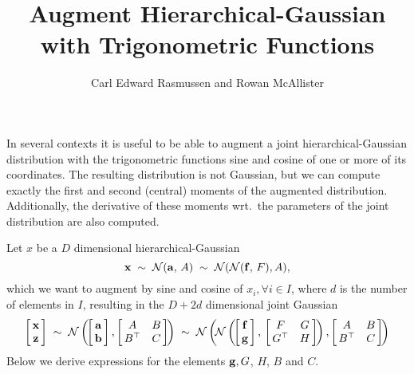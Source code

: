 \documentclass{article}
\title{Augment Hierarchical-Gaussian with Trigonometric Functions}
\author{Carl Edward Rasmussen and Rowan McAllister}
\newcommand{\bfa}{{\bf a}}
\newcommand{\bfb}{{\bf b}}
\newcommand{\bff}{{\bf f}}
\newcommand{\bfg}{{\bf g}}
\newcommand{\bfz}{{\bf z}}
\newcommand{\bfx}{{\bf x}}
\begin{document}
\maketitle

In several contexts it is useful to be able to augment a joint
hierarchical-Gaussian distribution with the trigonometric functions sine and cosine
of one or more of its coordinates. The resulting distribution is not
Gaussian, but we can compute exactly the first and second (central)
moments of the augmented distribution. Additionally, the derivative of
these moments wrt.~the parameters of the joint distribution are also
computed.

Let $x$ be a $D$ dimensional hierarchical-Gaussian
\[
\bfx\;\sim\;{\cal N}(\bfa,\,A)\;\sim\;{\cal N}({\cal N}(\bff,\,F),A),
\]
which we want to augment by sine and cosine of $x_i, \forall i\in I$,
where $d$ is the number of elements in $I$, resulting in the
$D\!+\!2d$ dimensional joint Gaussian
\[
\left[\!\!\begin{array}{c}\bfx\\ \bfz\end{array}\!\!\right]\;\sim\;
{\cal N}\left(\!\left[\!\!\begin{array}{c}\bfa\\\bfb\end{array}\!\!\right],
\left[\!\!\begin{array}{cc}A&B\\B^\top&C\end{array}\!\!\right]\!\right)\;\sim\;
{\cal N}\left(\!{\cal N}\left(\!\left[\!\!\begin{array}{c}\bff\\
      \bfg\end{array}\!\!\right],\,
\left[\!\!\begin{array}{cc}F&G\\G^\top&H\end{array}\!\!\right]\!\right),
\left[\!\!\begin{array}{cc}A&B\\B^\top&C\end{array}\!\!\right]\!\right)
\]
Below we derive expressions for the elements $\bfg, G$, $H$, $B$ and $C$.
\end{document}
